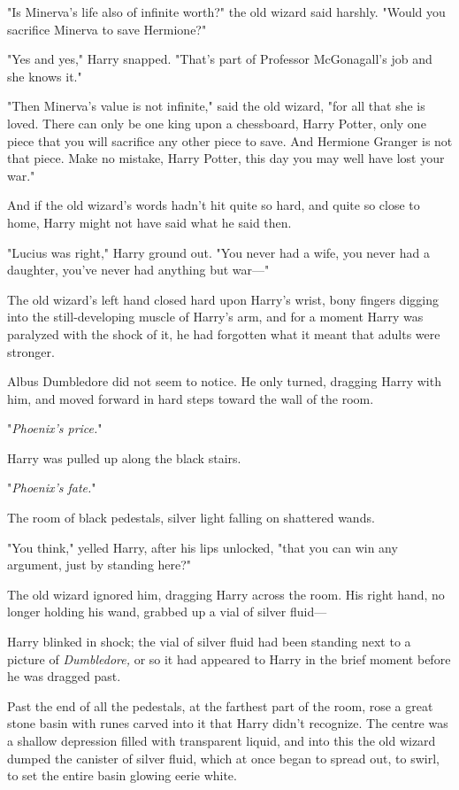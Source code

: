 "Is Minerva’s life also of infinite worth?" the old wizard said harshly. "Would
you sacrifice Minerva to save Hermione?"

"Yes and yes," Harry snapped. "That’s part of Professor McGonagall’s job and
she knows it."

"Then Minerva’s value is not infinite," said the old wizard, "for all that she
is loved. There can only be one king upon a chessboard, Harry Potter, only one
piece that you will sacrifice any other piece to save. And Hermione Granger is
not that piece. Make no mistake, Harry Potter, this day you may well have lost
your war."

And if the old wizard’s words hadn’t hit quite so hard, and quite so close to
home, Harry might not have said what he said then.

"Lucius was right," Harry ground out. "You never had a wife, you never had a
daughter, you’ve never had anything but war—"

The old wizard’s left hand closed hard upon Harry’s wrist, bony fingers digging
into the still-developing muscle of Harry’s arm, and for a moment Harry was
paralyzed with the shock of it, he had forgotten what it meant that adults were
stronger.

Albus Dumbledore did not seem to notice. He only turned, dragging Harry with
him, and moved forward in hard steps toward the wall of the room.

"\emph{Phoenix’s price.}"

Harry was pulled up along the black stairs.

"\emph{Phoenix’s fate.}"

The room of black pedestals, silver light falling on shattered wands.

"You think," yelled Harry, after his lips unlocked, "that you can win any
argument, just by standing here?"

The old wizard ignored him, dragging Harry across the room. His right hand, no
longer holding his wand, grabbed up a vial of silver fluid—

Harry blinked in shock; the vial of silver fluid had been standing next to a
picture of \emph{Dumbledore,} or so it had appeared to Harry in the brief
moment before he was dragged past.

Past the end of all the pedestals, at the farthest part of the room, rose a
great stone basin with runes carved into it that Harry didn’t recognize. The
centre was a shallow depression filled with transparent liquid, and into this
the old wizard dumped the canister of silver fluid, which at once began to
spread out, to swirl, to set the entire basin glowing eerie white.

